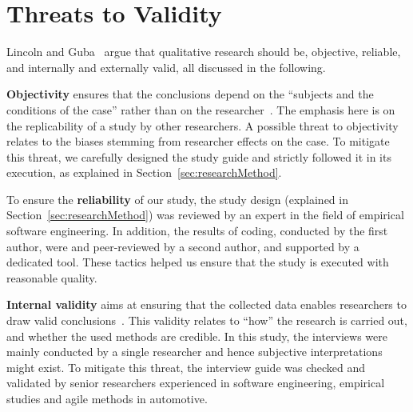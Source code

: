 \documentclass[sigconf,review, anonymous]{acmart}
\begin{document}

\maketitle







\section{Threats to Validity}\label{sec:threatsToValidity}
Lincoln and Guba~\cite{Lincoln1985} argue that qualitative research should be, objective, reliable, and internally and externally valid, all discussed in the following.%

{\bf Objectivity} ensures that the conclusions depend on the ``subjects and the conditions of the case'' rather than on the researcher~\cite{Miles}. The emphasis here is on the replicability of a study by other researchers. A possible threat to objectivity relates to the biases stemming from researcher effects on the case. To mitigate this threat, we carefully designed the study guide and strictly followed it in its execution, as explained in Section~\ref{sec:researchMethod}. 

To ensure the {\bf reliability} of our study, the study design (explained in Section~\ref{sec:researchMethod}) was reviewed by an expert in the field of empirical software engineering. In addition, the results of coding, conducted by the first author, were and peer-reviewed by a second author, and supported by a dedicated tool. These tactics helped us ensure that the study is executed with reasonable quality.

\textbf{Internal validity} aims at ensuring that the collected data enables researchers to draw valid conclusions~\cite{Creswell2003}. This validity relates to ``how'' the research is carried out, and whether the used methods are credible. In this study, the interviews were mainly conducted by a single researcher and hence subjective interpretations might exist. To mitigate this threat, the interview guide was checked and validated by senior researchers experienced in software engineering, empirical studies and agile methods in automotive.
\end{document}
